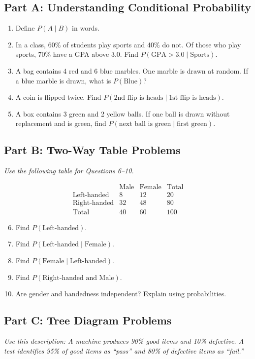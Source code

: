 \documentclass[14pt]{extarticle}
\begin{document}
\subsection*{Part A: Understanding Conditional Probability}
\begin{enumerate}
  \item Define \(P(A\mid B)\) in words.
  \item In a class, 60\% of students play sports and 40\% do not. Of those who play sports, 70\% have a GPA above 3.0. Find \(P(\text{GPA}>3.0\mid \text{Sports})\).
  \item A bag contains 4 red and 6 blue marbles. One marble is drawn at random. If a blue marble is drawn, what is \(P(\text{Blue})\)?
  \item A coin is flipped twice. Find \(P(\text{2nd flip is heads}\mid \text{1st flip is heads})\).
  \item A box contains 3 green and 2 yellow balls. If one ball is drawn without replacement and is green, find \(P(\text{next ball is green}\mid \text{first green})\).
\end{enumerate}

\subsection*{Part B: Two-Way Table Problems}
\textit{Use the following table for Questions 6–10.}

\[
\begin{array}{c|ccc}
 & \text{Male} & \text{Female} & \text{Total} \\ \hline
\text{Left-handed} & 8 & 12 & 20\\
\text{Right-handed} & 32 & 48 & 80\\ \hline
\text{Total} & 40 & 60 & 100
\end{array}
\]

\begin{enumerate}
  \setcounter{enumi}{5}
  \item Find \(P(\text{Left-handed})\).
  \item Find \(P(\text{Left-handed}\mid \text{Female})\).
  \item Find \(P(\text{Female}\mid \text{Left-handed})\).
  \item Find \(P(\text{Right-handed and Male})\).
  \item Are gender and handedness independent? Explain using probabilities.
\end{enumerate}

\subsection*{Part C: Tree Diagram Problems}
\textit{Use this description: A machine produces 90\% good items and 10\% defective. A test identifies 95\% of good items as “pass” and 80\% of defective items as “fail.”}
\end{document}
